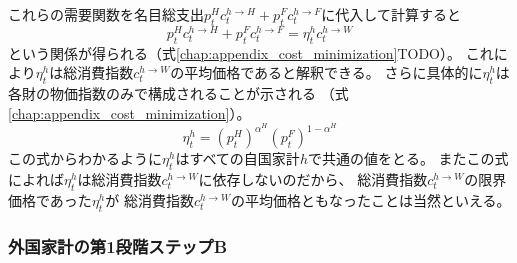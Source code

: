 これらの需要関数を名目総支出\(p_t^Hc_t^{h\to H}+p_t^Fc_t^{h\to F}\)に代入して計算すると
\begin{equation}
\label{form:chapter3_households_stage1b_home_c_h_W_problem_eta_h_average_eq}
    p_t^Hc_t^{h\to H}+p_t^Fc_t^{h\to F}=\eta_t^hc_t^{h\to W}
\end{equation}
という関係が得られる（式\eqref{chap:appendix_cost_minimization}TODO）。
これにより\(\eta_t^h\)は総消費指数\(c_t^{h\to W}\)の平均価格であると解釈できる。
さらに具体的に\(\eta_t^h\)は各財の物価指数のみで構成されることが示される
（式\eqref{chap:appendix_cost_minimization}）。
\begin{equation}
\label{form:chapter3_households_stage1b_home_c_h_W_problem_eta_h_eq}
    \eta_t^h=(p_t^H)^{\alpha^H}(p_t^F)^{1-\alpha^H}
\end{equation}
この式からわかるように\(\eta_t^h\)はすべての自国家計\(h\)で共通の値をとる。
またこの式によれば\(\eta_t^h\)は総消費指数\(c_t^{h\to W}\)に依存しないのだから、
総消費指数\(c_t^{h\to W}\)の限界価格であった\(\eta_t^h\)が
総消費指数\(c_t^{h\to W}\)の平均価格ともなったことは当然といえる。

\subsubsection{外国家計の第1段階ステップB}
\label{sec:chapter3_households_stage1b_foreign}

